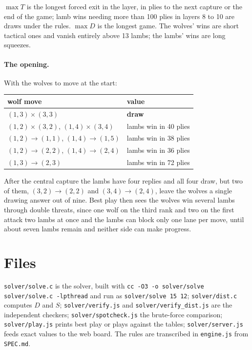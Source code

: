 \documentclass[11pt,a4paper]{article}
\begin{document}
$\max T$ is the longest forced exit in the layer, in plies to the next capture or
the end of the game; lamb wins needing more than 100 plies in layers 8 to 10 are
draws under the rules. $\max D$ is the longest game. The wolves' wins are short tactical ones and vanish
entirely above 13 lambs; the lambs' wins are long squeezes.

\paragraph{The opening.} With the wolves to move at the start:

\begin{center}\small
\begin{tabular}{@{}ll@{}}
\toprule
wolf move & value \\
\midrule
$(1,3)\times(3,3)$ & \textbf{draw} \\
$(1,2)\times(3,2)$, $(1,4)\times(3,4)$ & lambs win in 40 plies \\
$(1,2)\to(1,1)$, $(1,4)\to(1,5)$ & lambs win in 38 plies \\
$(1,2)\to(2,2)$, $(1,4)\to(2,4)$ & lambs win in 36 plies \\
$(1,3)\to(2,3)$ & lambs win in 72 plies \\
\bottomrule
\end{tabular}
\end{center}

After the central capture the lambs have four replies and all four draw, but two
of them, $(3,2)\to(2,2)$ and $(3,4)\to(2,4)$, leave the wolves a single drawing
answer out of nine. Best play then sees the wolves win several lambs through
double threats, since one wolf on the third rank and two on the first attack two
lambs at once and the lambs can block only one lane per move, until about seven
lambs remain and neither side can make progress.

\section*{Files}

\begin{sloppypar}
\texttt{solver/solve.c} is the solver, built with
\texttt{cc -O3 -o solver/solve solver/solve.c -lpthread} and run as
\texttt{solver/solve 15 12}; \texttt{solver/dist.c} computes $D$ and $S$;
\texttt{solver/verify.js} and \texttt{solver/verify\_dist.js} are the
independent checkers; \texttt{solver/spotcheck.js}
the brute-force comparison; \texttt{solver/play.js} prints best play or plays
against the tables; \texttt{solver/server.js} feeds exact values to the web
board. The rules are transcribed in \texttt{engine.js} from \texttt{SPEC.md}.
\end{sloppypar}
\end{document}
